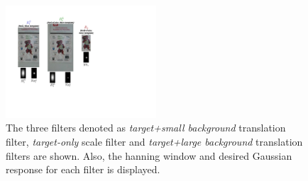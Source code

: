 \documentclass[10pt,twocolumn,letterpaper]{article}
\begin{document}
\begin{figure}[!t]
\includegraphics[width=0.5\textwidth]{figures/Filters_Details.pdf}
\caption{The three filters denoted as \textit{target+small background} translation filter,
  \textit{target-only} scale filter and \textit{target+large background} translation filters are
  shown. Also, the hanning window and desired Gaussian response for
  each filter is displayed.}
\label{fig:Filters}
\end{figure}
\end{document}

